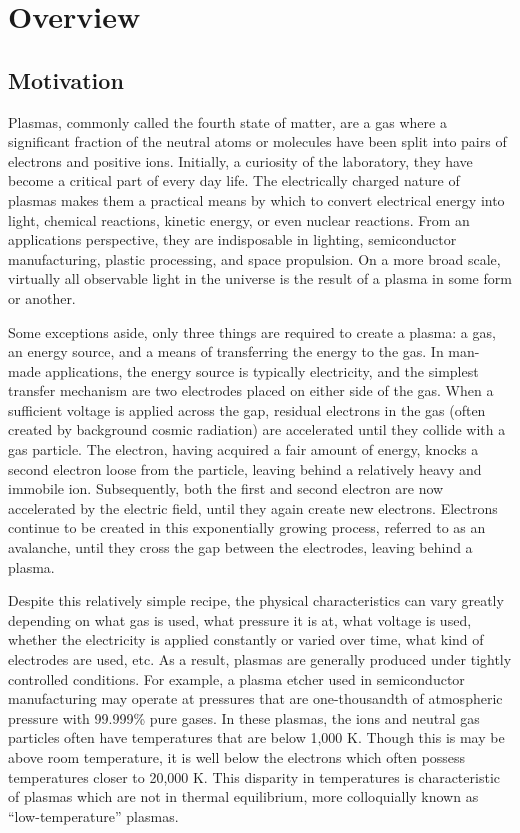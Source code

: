 \section{Overview}

\subsection{Motivation}
Plasmas, commonly called the fourth state of matter, are a gas where a
significant fraction of the neutral atoms or molecules have been split into
pairs of electrons and positive ions. Initially, a curiosity of the laboratory,
they have become a critical part of every day life. The electrically charged
nature of plasmas makes them a practical means by which to convert electrical
energy into light, chemical reactions, kinetic energy, or even nuclear
reactions. From an applications perspective, they are indisposable in lighting,
semiconductor manufacturing, plastic processing, and space propulsion. On a more
broad scale, virtually all observable light in the universe is the result of a
plasma in some form or another.

Some exceptions aside, only three things are required to create a plasma: a gas,
an energy source, and a means of transferring the energy to the gas. In man-made
applications, the energy source is typically electricity, and the simplest
transfer mechanism are two electrodes placed on either side of the gas. When a
sufficient voltage is applied across the gap, residual electrons in the gas
(often created by background cosmic radiation) are accelerated until they
collide with a gas particle. The electron, having acquired a fair amount of
energy, knocks a second electron loose from the particle, leaving behind a
relatively heavy and immobile ion. Subsequently, both the first and second
electron are now accelerated by the electric field, until they again create new
electrons. Electrons continue to be created in this exponentially growing
process, referred to as an avalanche, until they cross the gap between the
electrodes, leaving behind a plasma.

Despite this relatively simple recipe, the physical characteristics can vary
greatly depending on what gas is used, what pressure it is at, what voltage is
used, whether the electricity is applied constantly or varied over time, what
kind of electrodes are used, etc. As a result, plasmas are generally produced
under tightly controlled conditions. For example, a plasma etcher used in
semiconductor manufacturing may operate at pressures that are one-thousandth of
atmospheric pressure with 99.999\% pure gases. In these plasmas, the ions and
neutral gas particles often have temperatures that are below 1,000 K. Though this
is may be above room temperature, it is well below the electrons which often
possess temperatures closer to 20,000 K. This disparity in temperatures is
characteristic of plasmas which are not in thermal equilibrium, more
colloquially known as ``low-temperature'' plasmas.


